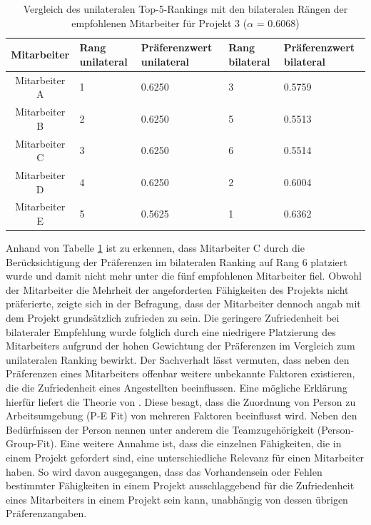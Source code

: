 \begin{table}[htbp]
    \begin{center}
    \begin{tabular}{c|p{0.7in}|p{0.95in}|p{0.7in}|p{0.95in}}
    {\textbf{Mitarbeiter}} & {\textbf{Rang unilateral}} & {\textbf{Präferenzwert unilateral}} & {\textbf{Rang bilateral}} & {\textbf{Präferenzwert bilateral}} \\
    \hline
	Mitarbeiter A & \hfil1 & \hfil0.6250 & \hfil3 & \hfil0.5759 \\
    \hline
    Mitarbeiter B & \hfil2 & \hfil0.6250 & \hfil5 & \hfil0.5513 \\
    \hline
	Mitarbeiter C & \hfil3 & \hfil0.6250 & \hfil6 & \hfil0.5514 \\
    \hline
	Mitarbeiter D & \hfil4 & \hfil0.6250 & \hfil2 & \hfil0.6004 \\
    \hline
	Mitarbeiter E & \hfil5 & \hfil0.5625 & \hfil1 & \hfil0.6362 \\
    \end{tabular}
    \end{center}
    \caption[Vergleich des unilateralen Top-5-Rankings mit den bilateralen Rängen der empfohlenen Mitarbeiter für Projekt 3 ($\alpha$ = 0.6068)]{Vergleich des unilateralen Top-5-Rankings mit den bilateralen Rängen der empfohlenen Mitarbeiter für Projekt 3 ($\alpha$ = 0.6068)}
	\label{tab:diskussion:tab1}
\end{table}

Anhand von Tabelle \ref{tab:diskussion:tab1} ist zu erkennen, dass Mitarbeiter C durch die Berücksichtigung der Präferenzen im bilateralen Ranking auf Rang 6 platziert wurde und damit nicht mehr unter die fünf empfohlenen Mitarbeiter fiel.
Obwohl der Mitarbeiter die Mehrheit der angeforderten Fähigkeiten des Projekts nicht präferierte, zeigte sich in der Befragung, dass der Mitarbeiter dennoch angab mit dem Projekt grundsätzlich zufrieden zu sein.
Die geringere Zufriedenheit bei bilateraler Empfehlung wurde folglich durch eine niedrigere Platzierung des Mitarbeiters aufgrund der hohen Gewichtung der Präferenzen im Vergleich zum unilateralen Ranking bewirkt.
Der Sachverhalt lässt vermuten, dass neben den Präferenzen eines Mitarbeiters offenbar weitere unbekannte Faktoren existieren, die die Zufriedenheit eines Angestellten beeinflussen.
Eine mögliche Erklärung hierfür liefert die Theorie von \textcite[S. 1ff.]{malinowski:2006}.
Diese besagt, dass die Zuordnung von Person zu Arbeitsumgebung (\ac{P-E Fit}) von mehreren Faktoren beeinflusst wird.
Neben den Bedürfnissen der Person nennen \textcite[S. 1ff.]{malinowski:2006} unter anderem die Teamzugehörigkeit (Person-Group-Fit).
Eine weitere Annahme ist, dass die einzelnen Fähigkeiten, die in einem Projekt gefordert sind, eine unterschiedliche Relevanz für einen Mitarbeiter haben.
So wird davon ausgegangen, dass das Vorhandensein oder Fehlen bestimmter Fähigkeiten in einem Projekt ausschlaggebend für die Zufriedenheit eines Mitarbeiters in einem Projekt sein kann, unabhängig von dessen übrigen Präferenzangaben.

